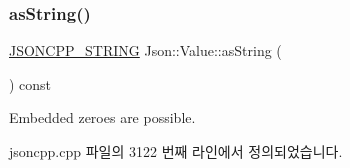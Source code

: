 \mbox{\label{class_json_1_1_value_ae3f9b0d38f820ccdd8888aa92ea6e792}} 
\subsubsection{\texorpdfstring{as\+String()}{asString()}}
{\footnotesize\ttfamily \hyperlink{json_8h_a1e723f95759de062585bc4a8fd3fa4be}{J\+S\+O\+N\+C\+P\+P\+\_\+\+S\+T\+R\+I\+NG} Json\+::\+Value\+::as\+String (\begin{DoxyParamCaption}{ }\end{DoxyParamCaption}) const}



Embedded zeroes are possible. 



jsoncpp.\+cpp 파일의 3122 번째 라인에서 정의되었습니다.


